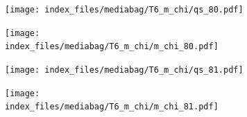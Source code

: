 \documentclass[
  11pt,
  letterpaper,
]{scrreprt}
\begin{document}
\begin{figure}

\begin{minipage}{0.50\linewidth}

\begin{figure}[H]

{\centering \texttt{[image: index\_files/mediabag/T6\_m\_chi/qs\_80.pdf]}

}


\end{figure}%

\end{minipage}%
%
\begin{minipage}{0.50\linewidth}

\begin{figure}[H]

{\centering \texttt{[image: index\_files/mediabag/T6\_m\_chi/m\_chi\_80.pdf]}

}


\end{figure}%

\end{minipage}%

\end{figure}%

\begin{figure}

\begin{minipage}{0.50\linewidth}

\begin{figure}[H]

{\centering \texttt{[image: index\_files/mediabag/T6\_m\_chi/qs\_81.pdf]}

}


\end{figure}%

\end{minipage}%
%
\begin{minipage}{0.50\linewidth}

\begin{figure}[H]

{\centering \texttt{[image: index\_files/mediabag/T6\_m\_chi/m\_chi\_81.pdf]}

}


\end{figure}%

\end{minipage}%

\end{figure}%
\end{document}
